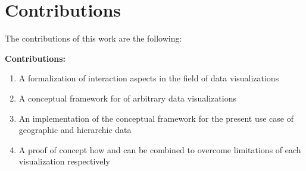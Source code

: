 \section{Contributions}


\begin{minipage}{\textwidth}
	The contributions of this work are the following: \\
	\begin{tcolorbox}
		\textbf{Contributions:}
		\begin{enumerate}
  \item A formalization of interaction aspects in the field of data visualizations
  \item A conceptual framework for \cmvs{} of arbitrary data visualizations
  \item An implementation of the conceptual framework for the present use case of geographic and hierarchic data
  \item A proof of concept how \tmap{} and \gv{} can be combined to overcome limitations of each visualization respectively
		\end{enumerate}
	\end{tcolorbox}
\end{minipage} \\



